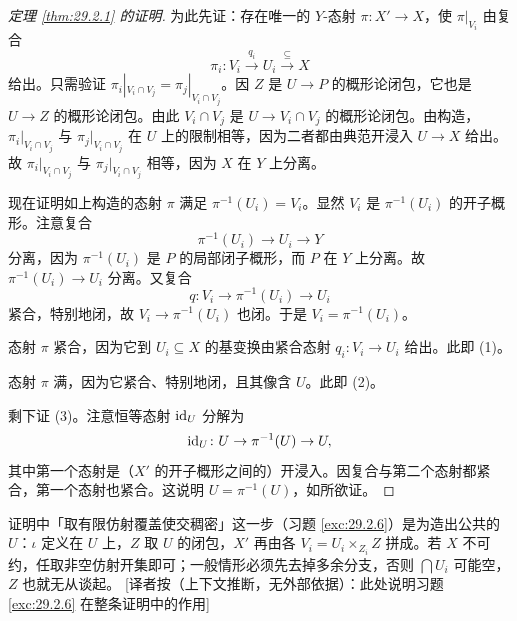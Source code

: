\begin{proof}[定理 \ref{thm:29.2.1} 的证明]
为此先证：存在唯一的 $Y$-态射 $\pi\colon X'\to X$，使 $\pi|_{V_i}$ 由复合
\[
\pi_i\colon V_i\xrightarrow{q_i}U_i\xrightarrow{\subseteq}X
\]
给出。只需验证 $\pi_i|_{V_i\cap V_j}=\pi_j|_{V_i\cap V_j}$。因 $Z$ 是 $U\to P$ 的概形论闭包，它也是 $U\to Z$ 的概形论闭包。由此 $V_i\cap V_j$ 是 $U\to V_i\cap V_j$ 的概形论闭包。由构造，$\pi_i|_{V_i\cap V_j}$ 与 $\pi_j|_{V_i\cap V_j}$ 在 $U$ 上的限制相等，因为二者都由典范开浸入 $U\to X$ 给出。故 $\pi_i|_{V_i\cap V_j}$ 与 $\pi_j|_{V_i\cap V_j}$ 相等，因为 $X$ 在 $Y$ 上分离。

现在证明如上构造的态射 $\pi$ 满足 $\pi^{-1}(U_i)=V_i$。显然 $V_i$ 是 $\pi^{-1}(U_i)$ 的开子概形。注意复合
\[
\pi^{-1}(U_i)\to U_i\to Y
\]
分离，因为 $\pi^{-1}(U_i)$ 是 $P$ 的局部闭子概形，而 $P$ 在 $Y$ 上分离。故 $\pi^{-1}(U_i)\to U_i$ 分离。又复合
\[
q\colon V_i\to\pi^{-1}(U_i)\to U_i
\]
紧合，特别地闭，故 $V_i\to\pi^{-1}(U_i)$ 也闭。于是 $V_i=\pi^{-1}(U_i)$。

态射 $\pi$ 紧合，因为它到 $U_i\subseteq X$ 的基变换由紧合态射 $q_i\colon V_i\to U_i$ 给出。此即 (1)。

态射 $\pi$ 满，因为它紧合、特别地闭，且其像含 $U$。此即 (2)。

剩下证 (3)。注意恒等态射 $\operatorname{id}_U$ 分解为
\[
\operatorname{id}_U\colon U\to\pi^{-1}(U)\to U,
\]
其中第一个态射是（$X'$ 的开子概形之间的）开浸入。因复合与第二个态射都紧合，第一个态射也紧合。这说明 $U=\pi^{-1}(U)$，如所欲证。
\end{proof}

\begin{yizhu}
证明中「取有限仿射覆盖使交稠密」这一步（习题 \ref{exc:29.2.6}）是为造出公共的 $U$：$\iota$ 定义在 $U$ 上，$Z$ 取 $U$ 的闭包，$X'$ 再由各 $V_i=U_i\times_{Z_i}Z$ 拼成。若 $X$ 不可约，任取非空仿射开集即可；一般情形必须先去掉多余分支，否则 $\bigcap U_i$ 可能空，$Z$ 也就无从谈起。
[译者按（上下文推断，无外部依据）：此处说明习题 \ref{exc:29.2.6} 在整条证明中的作用]
\end{yizhu}
